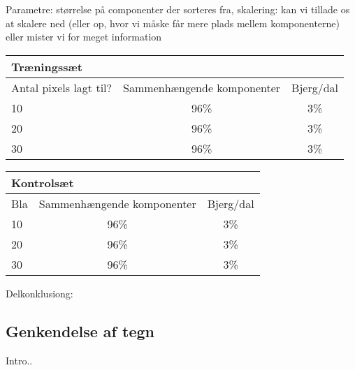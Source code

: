 Parametre: størrelse på componenter der sorteres fra, skalering: kan vi tillade os at skalere ned (eller op, hvor vi måske får mere plads mellem komponenterne) eller mister vi for meget information




\begin{tabular}{|l|c|c|}\hline
\multicolumn{3}{|l|}{Træningssæt} \\\hline
Antal pixels lagt til? & Sammenhængende komponenter & Bjerg/dal \\\hline
10 & 96\% & 3\% \\\hline
20 & 96\% & 3\% \\\hline
30 & 96\% & 3\% \\\hline \end{tabular}

\begin{tabular}{|l|c|c|}\hline
\multicolumn{3}{|l|}{Kontrolsæt} \\\hline
Bla & Sammenhængende komponenter & Bjerg/dal \\\hline
10 & 96\% & 3\% \\\hline
20 & 96\% & 3\% \\\hline
30 & 96\% & 3\% \\\hline \end{tabular}

Delkonklusiong:



\subsection{Genkendelse af tegn}
Intro..

